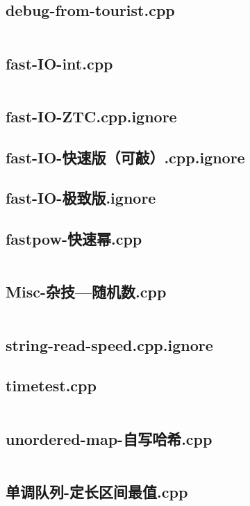 \documentclass[a4paper,landscape,twocolumn]{article} %
\begin{document}
\subsection{debug-from-tourist.cpp}
\inputminted{c++}{./codes/019}
\subsection{fast-IO-int.cpp}
\inputminted{c++}{./codes/020}
\subsection{fast-IO-ZTC.cpp.ignore}
\subsection{fast-IO-快速版（可敲）.cpp.ignore}
\subsection{fast-IO-极致版.ignore}
\subsection{fastpow-快速幂.cpp}
\inputminted{c++}{./codes/024}
\subsection{Misc-杂技---随机数.cpp}
\inputminted{c++}{./codes/025}
\subsection{string-read-speed.cpp.ignore}
\subsection{timetest.cpp}
\inputminted{c++}{./codes/027}
\subsection{unordered-map-自写哈希.cpp}
\inputminted{c++}{./codes/028}
\subsection{单调队列-定长区间最值.cpp}
\inputminted{c++}{./codes/029}
\end{document}
